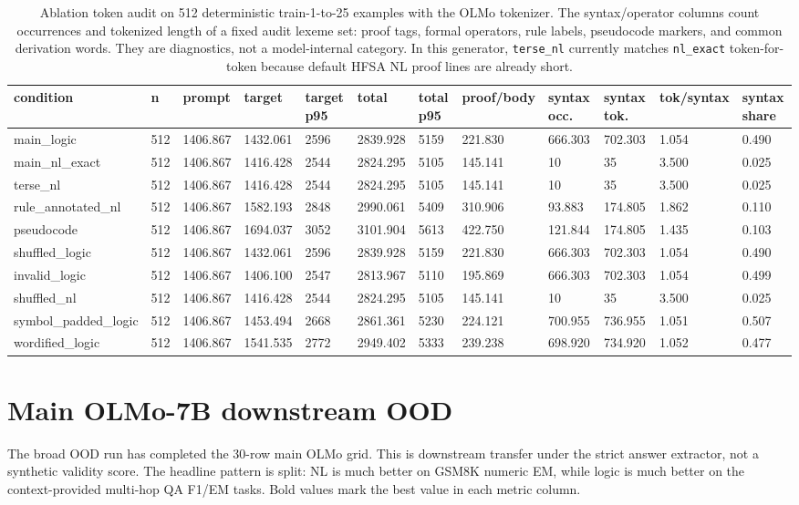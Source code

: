 \documentclass[10pt]{article}
\begin{document}
\begin{table}[H]
\centering
\scriptsize
\begin{tabular}{llllllllllll}
\toprule
condition & n & prompt & target & target p95 & total & total p95 & proof/body & syntax occ. & syntax tok. & tok/syntax & syntax share \\
\midrule
main\_logic & 512 & 1406.867 & 1432.061 & 2596 & 2839.928 & 5159 & 221.830 & 666.303 & 702.303 & 1.054 & 0.490 \\
main\_nl\_exact & 512 & 1406.867 & 1416.428 & 2544 & 2824.295 & 5105 & 145.141 & 10 & 35 & 3.500 & 0.025 \\
terse\_nl & 512 & 1406.867 & 1416.428 & 2544 & 2824.295 & 5105 & 145.141 & 10 & 35 & 3.500 & 0.025 \\
rule\_annotated\_nl & 512 & 1406.867 & 1582.193 & 2848 & 2990.061 & 5409 & 310.906 & 93.883 & 174.805 & 1.862 & 0.110 \\
pseudocode & 512 & 1406.867 & 1694.037 & 3052 & 3101.904 & 5613 & 422.750 & 121.844 & 174.805 & 1.435 & 0.103 \\
shuffled\_logic & 512 & 1406.867 & 1432.061 & 2596 & 2839.928 & 5159 & 221.830 & 666.303 & 702.303 & 1.054 & 0.490 \\
invalid\_logic & 512 & 1406.867 & 1406.100 & 2547 & 2813.967 & 5110 & 195.869 & 666.303 & 702.303 & 1.054 & 0.499 \\
shuffled\_nl & 512 & 1406.867 & 1416.428 & 2544 & 2824.295 & 5105 & 145.141 & 10 & 35 & 3.500 & 0.025 \\
symbol\_padded\_logic & 512 & 1406.867 & 1453.494 & 2668 & 2861.361 & 5230 & 224.121 & 700.955 & 736.955 & 1.051 & 0.507 \\
wordified\_logic & 512 & 1406.867 & 1541.535 & 2772 & 2949.402 & 5333 & 239.238 & 698.920 & 734.920 & 1.052 & 0.477 \\
\bottomrule
\end{tabular}
\caption{Ablation token audit on 512 deterministic train-1-to-25 examples with the OLMo tokenizer. The syntax/operator columns count occurrences and tokenized length of a fixed audit lexeme set: proof tags, formal operators, rule labels, pseudocode markers, and common derivation words. They are diagnostics, not a model-internal category. In this generator, \texttt{terse\_nl} currently matches \texttt{nl\_exact} token-for-token because default HFSA NL proof lines are already short.}
\end{table}

\section{Main OLMo-7B downstream OOD}
The broad OOD run has completed the 30-row main OLMo grid. This is downstream transfer under the strict answer extractor, not a synthetic validity score. The headline pattern is split: NL is much better on GSM8K numeric EM, while logic is much better on the context-provided multi-hop QA F1/EM tasks. Bold values mark the best value in each metric column.
\end{document}
